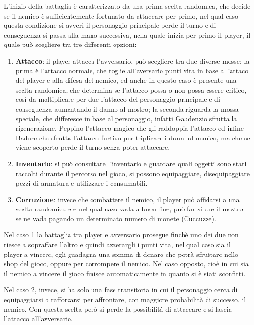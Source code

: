 \documentclass[10pt]{report}
\begin{document}
L'inizio della battaglia è caratterizzato da una prima scelta randomica, che decide se il nemico è sufficientemente
fortunato da attaccare per primo, nel qual caso questa condizione si avveri il  personaggio principale perde il turno e
di conseguenza si passa alla mano successiva, nella quale inizia per primo il player, il quale può scegliere tra tre
differenti opzioni:
\begin{enumerate}

    \item \textbf{Attacco}: il player attacca l'avversario, può scegliere tra due diverse mosse: la prima è l'attacco normale, che
    toglie all'aversario punti vita in base all'attaco del player e alla difesa del nemico, ed anche in questo caso è
    presente una scelta randomica, che determina se l'attacco possa o non possa essere critico, così da moltiplicare per due
    l'attacco del personaggio principale e di conseguenza aumentando il danno al mostro; la seconda riguarda la mossa
    speciale, che differesce in base al personaggio, infatti Gaudenzio sfrutta la rigenerazione, Peppino l'attacco magico
    che gli raddoppia l'attacco ed infine Badore che sfrutta l'attacco furtivo per triplicare i danni al nemico, ma che se
    viene scoperto perde il turno senza poter attaccare.

    \item \textbf{Inventario}: si può consultare l'inventario e guardare quali oggetti sono stati raccolti durante il percorso nel
    gioco, si possono equipaggiare, disequipaggiare pezzi di armatura e utilizzare i consumabili.

    \item \textbf{Corruzione}: invece che combattere il nemico, il player può affidarsi a una scelta randomica e e nel qual caso vada a
    buon fine, può far si che il mostro se ne vada pagando un determinato numero di monete (Cuccuzze).
\end{enumerate}


Nel caso 1 la battaglia tra player e avversario prosegue finchè uno dei due non riesce a sopraffare l'altro e quindi
azzerargli i punti vita, nel qual caso sia il player a vincere, egli guadagna una somma di denaro che potrà sfruttare
nello shop del gioco, oppure per corrompere il nemico.  Nel caso opposto, cioè in cui sia il nemico a vincere il gioco
finisce automaticamente in quanto si è stati sconfitti.

Nel caso 2, invece, si ha solo una fase transitoria in cui il personaggio cerca di equipaggiarsi o rafforzarsi per
affrontare, con maggiore probabilità di successo, il nemico. Con questa scelta però si perde la possibilità di attaccare
e si lascia l'attacco all'avversario.
\end{document}
